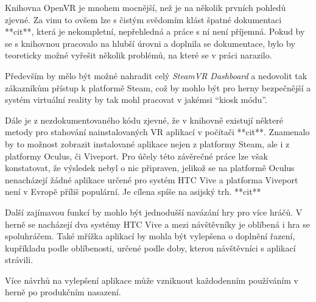 Knihovna OpenVR je mnohem mocnější, než je na několik prvních pohledů
zjevné. Za vinu to ovšem lze s čistým svědomím klást špatné dokumentaci **cit**,
která je nekompletní, nepřehledná a práce s ní není příjemná. Pokud by
se s knihovnou pracovalo na hlubší úrovni a doplnila se dokumentace,
bylo by teoreticky možné vyřešit několik problémů, na které se v práci
narazilo.

Především by mělo být možné nahradit celý \emph{SteamVR Dashboard} a
nedovolit tak zákazníkům přístup k platformě Steam, což by mohlo být pro
herny bezpečnější a systém virtuální reality by tak mohl pracovat v
jakémsi ``kiosk módu''. 

Dále je z nezdokumentovaného kódu zjevné, že v
knihovně existují některé metody pro stahování nainstalovaných VR
aplikací v počítači **cit**. Znamenalo by to možnost zobrazit instalované aplikace
nejen z platformy Steam, ale i z platformy Oculus, či Viveport. Pro
účely této závěrečné práce lze však konstatovat, že výsledek nebyl o nic
připraven, jelikož se na platformě Oculus nenacházejí žádné aplikace
určené pro systém HTC Vive a platforma Viveport není v Evropě příliš
populární. Je cílena spíše na asijský trh. **cit**

Další zajímavou funkcí by mohlo být jednodušší navázání hry pro více
hráčů. V herně se nacházejí dva systémy HTC Vive a mezi návštěvníky je
oblíbená i hra se spoluhráčem. Také mřížka aplikací by mohla být vylepšena o
doplnění řazení, kupříkladu podle oblíbenosti, určené podle doby, kterou
návštěvníci s aplikací strávili.

Více návrhů na vylepšení aplikace může vzniknout každodenním používáním
v herně po produkčním nasazení.
